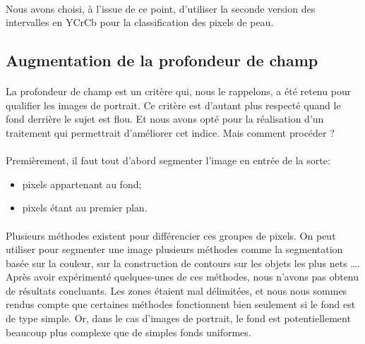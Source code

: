 \documentclass[11pt, french,screen]{report-rd-info}
\begin{document}
\paragraph*{}
Nous avons choisi, à l'issue de ce point, d'utiliser la seconde version des intervalles en YCrCb pour la classification des pixels de peau.

\subsection{Augmentation de la profondeur de champ}
\label{part:profondeur}
\paragraph*{}
La profondeur de champ est un critère qui, nous le rappelons, a été retenu pour qualifier les images de portrait. Ce critère est d'autant plus respecté quand le fond derrière le sujet est flou. Et nous avons opté pour la réalisation d'un traitement qui permettrait d'améliorer cet indice. Mais comment procéder ?

\paragraph*{}
Premièrement, il faut tout d'abord segmenter l'image en entrée de la sorte: 
\begin{itemize}
\item pixels appartenant au fond;
\item pixels étant au premier plan.
\end{itemize} 

\paragraph*{}
Plusieurs méthodes existent pour différencier ces groupes de pixels. On peut utiliser pour segmenter une image plusieurs méthodes comme la segmentation basée sur la couleur, sur la construction de contours sur les objets les plus nets \dots. 
Après avoir expérimenté quelques-unes de ces méthodes, nous n'avons pas obtenu de résultats concluants. Les zones étaient mal délimitées, et nous nous sommes rendus compte que certaines méthodes fonctionnent bien seulement si le fond est de type simple. Or, dans le cas d'images de portrait, le fond est potentiellement beaucoup plus complexe que de simples fonds uniformes.
\end{document}
